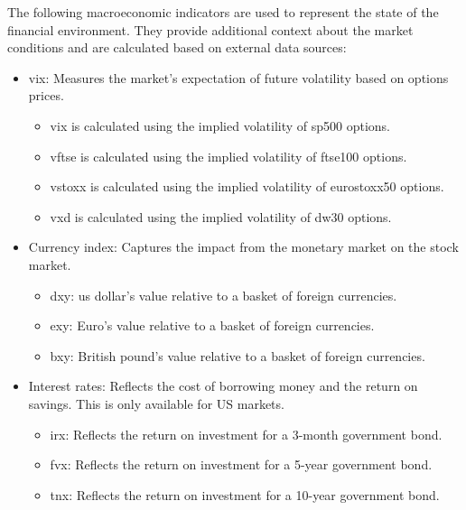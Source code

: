 The following macroeconomic indicators are used to represent the state of the financial environment. They provide additional context about the market conditions and are calculated based on external data sources:
\begin{itemize}
    \item \acrfull{vix}: Measures the market's expectation of future volatility based on options prices.
    \begin{itemize}
        \item \acrshort{vix} is calculated using the implied volatility of \acrfull{sp500} options.
        \item \acrshort{vftse} is calculated using the implied volatility of \acrfull{ftse100} options.
        \item \acrshort{vstoxx} is calculated using the implied volatility of \acrlong{eurostoxx50} options.
        \item \acrshort{vxd} is calculated using the implied volatility of \acrfull{dw30} options.
    \end{itemize}
    \item Currency index: Captures the impact from the monetary market on the stock market.
    \begin{itemize}
        \item \acrfull{dxy}: \acrfull{us} dollar's value relative to a basket of foreign currencies.
        \item \acrfull{exy}: Euro's value relative to a basket of foreign currencies.
        \item \acrfull{bxy}: British pound's value relative to a basket of foreign currencies.
    \end{itemize}
    \item Interest rates: Reflects the cost of borrowing money and the return on savings. This is only available for US markets.
    \begin{itemize}
        \item \acrfull{irx}: Reflects the return on investment for a 3-month government bond.
        \item \acrfull{fvx}: Reflects the return on investment for a 5-year government bond.
        \item \acrfull{tnx}: Reflects the return on investment for a 10-year government bond.
    \end{itemize}
\end{itemize}
